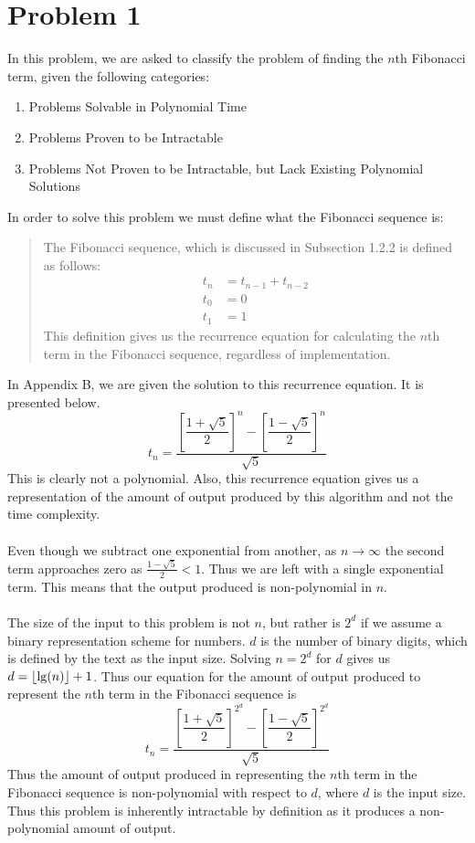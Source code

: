 \section*{Problem 1}

In this problem, we are asked to classify the problem of finding the $n$th 
Fibonacci term, given the following categories:
\begin{enumerate}
    \item Problems Solvable in Polynomial Time
    \item Problems Proven to be Intractable
    \item Problems Not Proven to be Intractable, but Lack Existing Polynomial 
          Solutions
\end{enumerate}
%
In order to solve this problem we must define what the Fibonacci sequence is:

\begin{quote}
The Fibonacci sequence, which is discussed in Subsection 1.2.2 is 
defined as follows: 
%
\begin{align*}
t_n &= t_{n-1} + t_{n-2} \\
t_0 &= 0 \\
t_1 &= 1
\end{align*}
This definition gives us the recurrence equation for calculating the $n$th 
term in the Fibonacci sequence, regardless of implementation.
\end{quote}
%
In Appendix B, we are given the solution to this recurrence equation. It is 
presented below. 
%
$$
t_n = 
    \dfrac{\left[\dfrac{1 + \sqrt{5}}{2}\right]^n - 
           \left[\dfrac{1 - \sqrt{5}}{2}\right]^n}{\sqrt{5}}
$$
This is clearly not a polynomial. Also, this recurrence equation gives us a 
representation of the amount of output produced by this algorithm and not the
time complexity. 
\\
\\
Even though we subtract one exponential from another, as $n \rightarrow \infty$
the second term approaches zero as $\frac{1 - \sqrt{5}}{2} < 1$. Thus we
are left with a single exponential term. This means that the output produced
is non-polynomial in $n$.
\\
\\
The size of the input to this problem is not $n$, but rather is $2^d$ if we 
assume a binary representation scheme for numbers. $d$ is the number of binary
digits, which is defined by the text as the input size. Solving $n = 2^d$ for 
$d$ gives us $d = \lfloor\lg(n)\rfloor + 1$. Thus our equation for the amount of 
output produced to represent the $n$th term in the Fibonacci sequence is 
$$
t_n = 
    \dfrac{\left[\dfrac{1 + \sqrt{5}}{2}\right]^{2^d} - 
           \left[\dfrac{1 - \sqrt{5}}{2}\right]^{2^d}}{\sqrt{5}}
$$
Thus the amount of output produced in representing the $n$th term in the 
Fibonacci sequence is non-polynomial with respect to $d$, where $d$ is the input 
size. Thus this problem is inherently intractable by definition as it produces
a non-polynomial amount of output.

